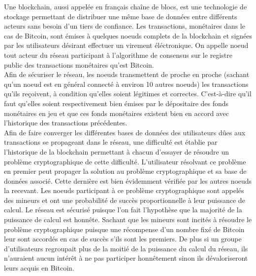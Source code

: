 \documentclass[12pt,a4paper]{article}
\begin{document}
	Une blockchain, aussi appelée en français chaîne de blocs, est une technologie de stockage permettant de distribuer une même base de données entre différents acteurs sans besoin d'un tiers de confiance. Les transactions, monétaires dans le cas de Bitcoin, sont émises à quelques noeuds complets de la blockchain et signées par les utilisateurs désirant effectuer un virement éléctronique. On appelle noeud tout acteur du réseau participant à l'algorithme de consensus sur le registre public des transactions monétaires qu'est Bitcoin.\\ %
	Afin de sécuriser le réseau, les noeuds transmettent de proche en proche (sachant qu'un noeud est en général connecté à environ 10 autres noeuds) les transactions qu'ils reçoivent, à condition qu'elles soient légitimes et correctes. C'est-à-dire qu'il faut qu'elles soient respectivement bien émises par le dépositaire des fonds monétaires en jeu et que ces fonds monétaires existent bien en accord avec l'historique des transactions précédentes.\\
	Afin de faire converger les différentes bases de données des utilisateurs dûes aux transactions se propageant dans le réseau, une difficulté est établie par l'historique de la blockchain permettant à chacun d'essayer de résoudre un problème cryptographique de cette difficulté. L'utilisateur résolvant ce problème en premier peut propager la solution au problème cryptographique et sa base de données associé. Cette dernière est bien évidemment vérifiée par les autres noeuds la recevant. Les noeuds participant à ce problème cryptographique sont appelés des mineurs et ont une probabilité de succès proportionnelle à leur puissance de calcul. Le réseau est sécurisé puisque l'on fait l'hypothèse que la majorité de la puissance de calcul est honnête. Sachant que les mineurs sont incités à résoudre le problème cryptographique puisque une récompense d'un nombre fixé de Bitcoin leur sont accordés en cas de succès s'ils sont les premiers. De plus si un groupe d'utilisateurs regroupait plus de la moitié de la puissance du calcul du réseau, ils n'auraient aucun intérêt à ne pas participer honnêtement sinon ils dévaloriseront leurs acquis en Bitcoin.\\%
\end{document}
